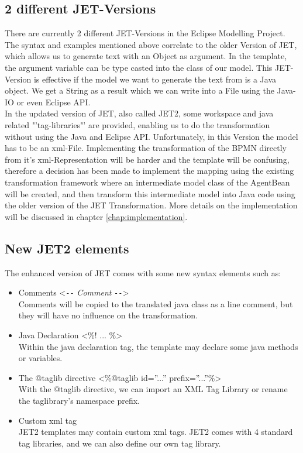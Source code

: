 \subsection{2 different JET-Versions}
There are currently 2 different JET-Versions in the Eclipse Modelling Project. The syntax and examples mentioned above correlate to the older Version of JET, which allows us to generate text with an Object as argument. In the template, the argument variable can be type casted into the class of our model. This JET-Version is effective if the model we want to generate the text from is a Java object. We get a String as a result which we can write into a File using the Java-IO or even Eclipse API.\\

In the updated version of JET, also called JET2, some workspace and java related "'tag-libraries"' are provided, enabling us to do the transformation without using the Java and Eclipse API. Unfortunately, in this Version the model has to be an xml-File.
Implementing the transformation of the BPMN directly from it's xml-Representation will be harder and the template will be confusing, therefore a decision has been made to implement the mapping using the existing transformation framework where an intermediate model class of the AgentBean will be created, and then transform this intermediate model into Java code using the older version of the JET Transformation.
More details on the implementation will be discussed in chapter \ref{chap:implementation}.

\subsection{New JET2 elements}
The enhanced version of JET comes with some new syntax elements such as:
\begin{itemize}
	\item Comments <\verb|--| \textit{Comment} \verb|--|>\\
	      Comments will be copied to the translated java class as a line comment, but they will have no influence on the transformation.
	\item Java Declaration <\%! ... \%>\\
	      Within the java declaration tag, the template may declare some java methods or variables.
	\item The @taglib directive <\%@taglib id=''...'' prefix=''...''\%>\\
	      With the @taglib directive, we can import an XML Tag Library or rename the taglibrary's namespace prefix.
	\item Custom xml tag\\
	   		JET2 templates may contain custom xml tags. JET2 comes with 4 standard tag libraries, and we can also define our own tag library.				
\end{itemize}


